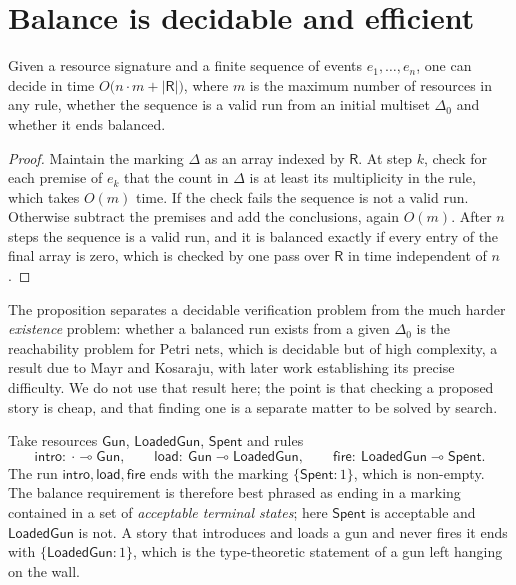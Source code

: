 \section{Balance is decidable and efficient}

\begin{proposition}\label{prop:balance}
Given a resource signature and a finite sequence of events $e_1,\dots,e_n$, one can decide in time $O\bigl(n\cdot m+\lvert\mathsf{R}\rvert\bigr)$, where $m$ is the maximum number of resources in any rule, whether the sequence is a valid run from an initial multiset $\Delta_0$ and whether it ends balanced.
\end{proposition}

\begin{proof}
Maintain the marking $\Delta$ as an array indexed by $\mathsf{R}$. At step $k$, check for each premise of $e_k$ that the count in $\Delta$ is at least its multiplicity in the rule, which takes $O(m)$ time. If the check fails the sequence is not a valid run. Otherwise subtract the premises and add the conclusions, again $O(m)$. After $n$ steps the sequence is a valid run, and it is balanced exactly if every entry of the final array is zero, which is checked by one pass over $\mathsf{R}$ in time independent of $n$.
\end{proof}

The proposition separates a decidable verification problem from the much harder \emph{existence} problem: whether a balanced run exists from a given $\Delta_0$ is the reachability problem for Petri nets, which is decidable but of high complexity, a result due to Mayr and Kosaraju, with later work establishing its precise difficulty. We do not use that result here; the point is that checking a proposed story is cheap, and that finding one is a separate matter to be solved by search.

\begin{example}
Take resources $\mathsf{Gun}$, $\mathsf{LoadedGun}$, $\mathsf{Spent}$ and rules
\[
\mathsf{intro}:\ \cdot\multimap\mathsf{Gun},\qquad
\mathsf{load}:\ \mathsf{Gun}\multimap\mathsf{LoadedGun},\qquad
\mathsf{fire}:\ \mathsf{LoadedGun}\multimap\mathsf{Spent}.
\]
The run $\mathsf{intro},\mathsf{load},\mathsf{fire}$ ends with the marking $\{\mathsf{Spent}:1\}$, which is non-empty. The balance requirement is therefore best phrased as ending in a marking contained in a set of \emph{acceptable terminal states}; here $\mathsf{Spent}$ is acceptable and $\mathsf{LoadedGun}$ is not. A story that introduces and loads a gun and never fires it ends with $\{\mathsf{LoadedGun}:1\}$, which is the type-theoretic statement of a gun left hanging on the wall.
\end{example}

